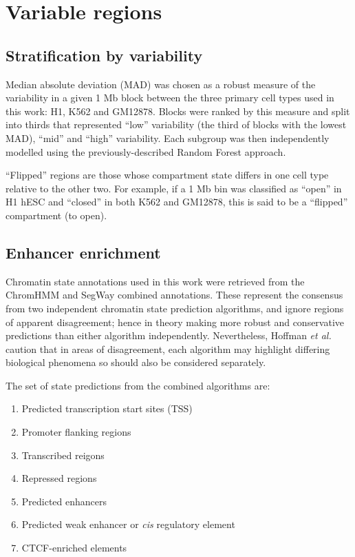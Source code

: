 \documentclass[a4paper,10pt,oneside]{book}
\begin{document}
\section{Variable regions}\label{variable-regions}

\subsection{Stratification by
variability}\label{sec:variable}

Median absolute deviation (MAD) was chosen as a robust measure of the
variability in a given 1 Mb block between the three primary cell types
used in this work: H1, K562 and GM12878. Blocks were ranked by this
measure and split into thirds that represented ``low'' variability (the
third of blocks with the lowest MAD), ``mid'' and ``high'' variability.
Each subgroup was then independently modelled using the
previously-described Random Forest approach.

``Flipped'' regions are those whose compartment state differs in one
cell type relative to the other two. For example, if a 1 Mb bin was
classified as ``open'' in H1 hESC and ``closed'' in both K562 and
GM12878, this is said to be a ``flipped'' compartment (to open).

\subsection{Enhancer enrichment}\label{enhancer-enrichment}

Chromatin state annotations used in this work were retrieved from the ChromHMM\cite{Ernst2011} and SegWay\cite{Hoffman2012} combined annotations.\cite{Hoffman2013} These represent the consensus from two independent chromatin state prediction algorithms, and ignore regions of apparent disagreement; hence in theory making more robust and conservative predictions than either algorithm independently. Nevertheless, Hoffman \emph{et al.} caution that in areas of disagreement, each algorithm may highlight differing biological phenomena so should also be considered separately.\cite{Hoffman2013}

The set of state predictions from the combined algorithms are:
\begin{enumerate}
\item Predicted transcription start sites (TSS)
\item Promoter flanking regions
\item Transcribed reigons
\item Repressed regions
\item Predicted enhancers
\item Predicted weak enhancer or \emph{cis} regulatory element
\item CTCF-enriched elements
\end{enumerate}
\end{document}
